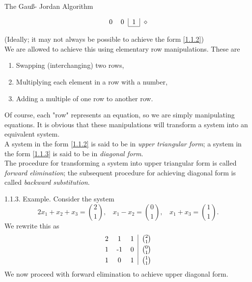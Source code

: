 \documentclass[smaller,hyperref={CJKbookmarks=true}]{beamer}
\begin{document}
\begin{frame}{The Gau\ss - Jordan Algorithm}
\begin{spacing}{1}
\begin{equation}
\begin{array}{c}
\begin{tabular}{cc|c|c}
    0 & $0$ & $1$ & $\diamond$ \\
    \cline{3-3}
  \end{tabular}
\end{array}
\end{equation}
\end{spacing}
\newpage
\begin{spacing}{1.2}
(Ideally; it may not always be possible to achieve the form \eqref{1.1.2})\\
We are allowed to achieve this using elementary row manipulations. These
are
\begin{enumerate}[1.]
  \item Swapping (interchanging) two rows,
  \item Multiplying each element in a row with a number,
  \item Adding a multiple of one row to another row.
\end{enumerate}
Of course, each "row" represents an equation, so we are simply
manipulating equations. It is obvious that these manipulations will
transform a system into an equivalent system.\\
A system in the form \eqref{1.1.2} is said to be in \emph{upper triangular form}; a
system in the form \eqref{1.1.3} is said to be in \emph{diagonal form}.\\
The procedure for transforming a system into upper triangular form is
called \emph{forward elimination}; the subsequent procedure for achieving diagonal
form is called\emph{ backward substitution}.
\end{spacing}
\newpage
\begin{spacing}{1.1}
\vspace*{12pt}
\alert{1.1.3. Example.} Consider the system
\[2x_1+x_2+x_3=\binom{2}{1},~~~~x_1-x_2=\binom{0}{1},~~~~x_1+x_3=\binom{1}{1}.\]
We rewrite this as
\begin{equation}
\begin{tabular}{ccc|c}
  2 & 1 & 1 & $\binom{2}{1}$ \\[3pt]
  1 & -1 & 0 & $\binom{0}{1}$ \\[3pt]
  1 & 0 & 1 & $\binom{1}{1}$ \\
\end{tabular}
\label{eq2}
\end{equation}
We now proceed with forward elimination to achieve upper diagonal form.
\end{spacing}
\end{frame}
\end{document}
